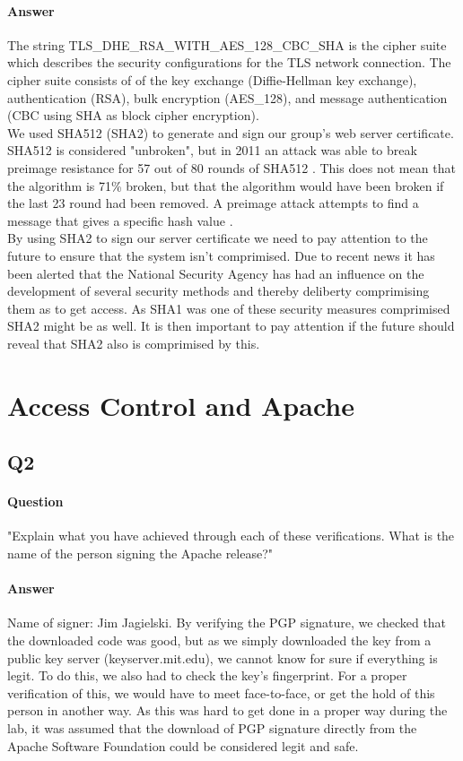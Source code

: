 \documentclass[11pt, a4paper]{article}
\begin{document}
\paragraph{Answer}
The string TLS\_DHE\_RSA\_WITH\_AES\_128\_CBC\_SHA is the cipher suite which describes the security configurations for the TLS network connection. The cipher suite consists of of the key exchange (Diffie-Hellman key exchange), authentication (RSA), bulk encryption (AES\_128), and message authentication (CBC using SHA as block cipher encryption). \\

We used SHA512 (SHA2) to generate and sign our group's web server certificate. SHA512 is considered "unbroken", but in 2011 an attack was able to break preimage resistance  for 57 out of 80 rounds of SHA512 \cite{sha512-attack}. This does not mean that the algorithm is 71\% broken, but that the algorithm would have been broken if the last 23 round had been removed. A preimage attack attempts to find a message that gives a specific hash value \cite{preimage-resistance}.\\

By using SHA2 to sign our server certificate we need to pay attention to the future to ensure that the system isn't comprimised. Due to recent news it has been alerted that the National Security Agency has had an influence on the development of several security methods and thereby deliberty comprimising them as to get access. As SHA1 was one of these security measures comprimised SHA2 might be as well. It is then important to pay attention if the future should reveal that SHA2 also is comprimised by this.

\section{Access Control and Apache}
\subsection{Q2}
\paragraph{Question}
"Explain what you have achieved through each of these verifications. What is the name of the person signing the Apache release?"
\paragraph{Answer}
Name of signer: Jim Jagielski.
By verifying the PGP signature, we checked that the downloaded code was good, but as we simply downloaded the key from a public key server (keyserver.mit.edu), we cannot know for sure if everything is legit. To do this, we also had to check the key's fingerprint. For a proper verification of this, we would have to meet face-to-face, or get the hold of this person in another way. As this was hard to get done in a proper way during the lab, it was assumed that the download of PGP signature directly from the Apache Software Foundation could be considered legit and safe.
\end{document}
